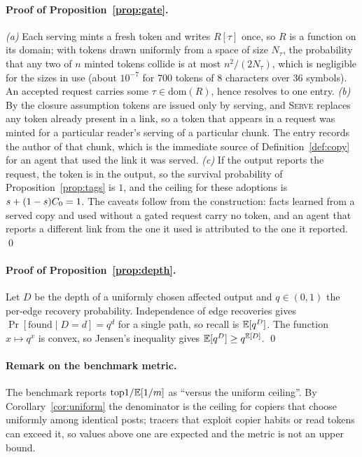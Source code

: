 \paragraph{Proof of Proposition~\ref{prop:gate}.}
\emph{(a)} Each serving mints a fresh token and writes $R[\tau]$ once, so $R$ is a function on its domain; with tokens drawn uniformly from a space of size $N_\tau$, the probability that any two of $n$ minted tokens collide is at most $n^2/(2N_\tau)$, which is negligible for the sizes in use (about $10^{-7}$ for 700 tokens of 8 characters over 36 symbols). An accepted request carries some $\tau\in\mathrm{dom}(R)$, hence resolves to one entry. \emph{(b)} By the closure assumption tokens are issued only by serving, and \textsc{Serve} replaces any token already present in a link, so a token that appears in a request was minted for a particular reader's serving of a particular chunk. The entry records the author of that chunk, which is the immediate source of Definition~\ref{def:copy} for an agent that used the link it was served. \emph{(c)} If the output reports the request, the token is in the output, so the survival probability of Proposition~\ref{prop:tags} is $1$, and the ceiling for these adoptions is $s+(1-s)C_0=1$. The caveats follow from the construction: facts learned from a served copy and used without a gated request carry no token, and an agent that reports a different link from the one it used is attributed to the one it reported. \qed

\paragraph{Proof of Proposition~\ref{prop:depth}.}
Let $D$ be the depth of a uniformly chosen affected output and $q\in(0,1)$ the per-edge recovery probability. Independence of edge recoveries gives $\Pr[\text{found}\mid D=d]=q^d$ for a single path, so recall is $\mathbb{E}[q^D]$. The function $x\mapsto q^x$ is convex, so Jensen's inequality gives $\mathbb{E}[q^D]\ge q^{\mathbb{E}[D]}$. \qed

\paragraph{Remark on the benchmark metric.}
The benchmark reports $\mathrm{top1}/\mathbb{E}[1/m]$ as ``versus the uniform ceiling''. By Corollary~\ref{cor:uniform} the denominator is the ceiling for copiers that choose uniformly among identical posts; tracers that exploit copier habits or read tokens can exceed it, so values above one are expected and the metric is not an upper bound.
